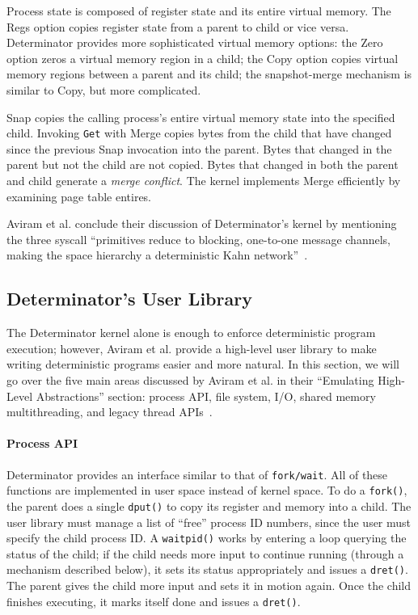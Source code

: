 Process state is composed of register state and its entire virtual memory.
The Regs option copies register state from a parent to child or vice versa.
Determinator provides more sophisticated virtual memory options: the Zero
option zeros a virtual memory region in a child; the Copy option copies
virtual memory regions between a parent and its child; the snapshot-merge
mechanism is similar to Copy, but more complicated.

Snap copies the calling process's entire virtual memory state into the specified
child. Invoking {\tt Get} with Merge copies bytes
from the child that have changed since the previous Snap invocation into the
parent. Bytes that changed in the parent but not the child are not copied. Bytes
that changed in both the parent and child generate a \emph{merge conflict}.
The kernel implements Merge efficiently by examining page table entires.

Aviram et al. conclude their discussion of Determinator's kernel by mentioning
the three syscall ``primitives reduce to blocking, one-to-one message channels,
making the space hierarchy a deterministic Kahn
network''~\cite{Aviram10,kahn1974semantics}.

\subsection{Determinator's User Library}

The Determinator kernel alone is enough to enforce deterministic program
execution; however, Aviram et al. provide a high-level user library to make
writing deterministic programs easier and more natural. In this section, we will
go over
the five main areas discussed by Aviram et al. in their ``Emulating High-Level
Abstractions'' section: process API, file
system, I/O, shared memory multithreading, and legacy thread APIs~\cite{Aviram10}.

\paragraph{Process API}
Determinator provides an interface similar to that of {\tt fork/wait}.
All of these functions are implemented in user space instead of kernel space.
To do a {\tt fork()}, the parent does a single {\tt dput()} to copy its register
and memory into a child. The user library must manage a list of ``free'' process
ID numbers, since the user must specify the child process ID. A {\tt waitpid()}
works by entering a loop querying the status of the child; if the child needs
more input to continue running (through a mechanism described below), it
sets its status appropriately and issues a {\tt dret()}. The parent gives the
child more input and sets it in motion again. Once the child finishes executing,
it marks itself done and issues a {\tt dret()}.

